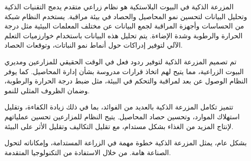 \begin{abstractAr}
  المزرعة الذكية في البيوت البلاستكية هو نظام زراعي متقدم يدمج التقنيات الذكية وتحليل البيانات لتحسين نمو المحاصيل والحصاد في بيئة مراقبة. يستخدم النظام شبكة من الحساسات وأجهزة المراقبة لجمع البيانات عن مختلف المعلمات البيئية مثل درجة الحرارة والرطوبة وشدة الإضاءة. يتم تحليل هذه البيانات باستخدام خوارزميات التعلم الآلي لتوفير إدراكات حول أنماط نمو النباتات، وتوقعات الحصاد.

	تم تصميم المزرعة الذكية لتوفير ردود فعل في الوقت الحقيقي للمزارعين ومديري البيوت الزراعية، مما يتيح لهم اتخاذ قرارات مدروسة بشأن إدارة المحاصيل. كما يوفر النظام الوصول عن بعد لمراقبة والتحكم في البيئة، مثل ضبط درجة الحرارة والرطوبة، وضمان الظروف المثلى للنمو.
	
	تتميز تكامل المزرعة الذكية بالعديد من الفوائد، بما في ذلك زيادة الكفاءة، وتقليل استهلاك الموارد، وتحسين حصاد المحاصيل. يتيح النظام للمزارعين تحسين عملياتهم لإنتاج المزيد من الغذاء بشكل مستدام، مع تقليل التكاليف وتقليل الأثر على البيئة.
	
	بشكل عام، يمثل المزرعة الذكية خطوة مهمة في الزراعة المستدامة، وإمكاناته لتحول الصناعة هامة. من خلال الاستفادة من التكنولوجيا المتقدمة.
	
	
	
\end{abstractAr}


